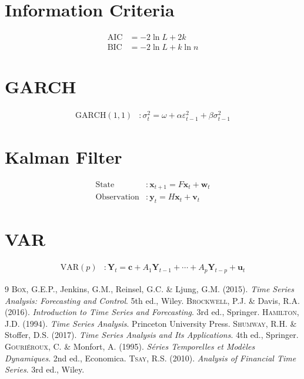 \documentclass[12pt,a4paper,twoside]{book}
\theoremstyle{definition}
\theoremstyle{plain}
\theoremstyle{remark}
\newcommand{\eps}{\varepsilon}
\DeclareMathOperator{\AIC}{AIC}
\DeclareMathOperator{\BIC}{BIC}
\begin{document}
\section{Information Criteria}
\begin{align}
\AIC &= -2\ln L + 2k \\
\BIC &= -2\ln L + k\ln n
\end{align}

\section{GARCH}
\begin{align}
\text{GARCH}(1,1) &: \sigma_t^2 = \omega + \alpha\eps_{t-1}^2 + \beta\sigma_{t-1}^2
\end{align}

\section{Kalman Filter}
\begin{align}
\text{State} &: \bm{x}_{t+1} = F\bm{x}_t + \bm{w}_t \\
\text{Observation} &: \bm{y}_t = H\bm{x}_t + \bm{v}_t
\end{align}

\section{VAR}
\begin{align}
\text{VAR}(p) &: \bm{Y}_t = \bm{c} + A_1\bm{Y}_{t-1}+\cdots+A_p\bm{Y}_{t-p}+\bm{u}_t
\end{align}

\begin{thebibliography}{9}
 \textsc{Box}, G.E.P., Jenkins, G.M., Reinsel, G.C. \& Ljung, G.M. (2015). \emph{Time Series Analysis: Forecasting and Control}. 5th ed., Wiley.
 \textsc{Brockwell}, P.J. \& Davis, R.A. (2016). \emph{Introduction to Time Series and Forecasting}. 3rd ed., Springer.
 \textsc{Hamilton}, J.D. (1994). \emph{Time Series Analysis}. Princeton University Press.
 \textsc{Shumway}, R.H. \& Stoffer, D.S. (2017). \emph{Time Series Analysis and Its Applications}. 4th ed., Springer.
 \textsc{Gouri\'eroux}, C. \& Monfort, A. (1995). \emph{S\'eries Temporelles et Mod\`eles Dynamiques}. 2nd ed., Economica.
 \textsc{Tsay}, R.S. (2010). \emph{Analysis of Financial Time Series}. 3rd ed., Wiley.
\end{thebibliography}

\printindex
\end{document}
